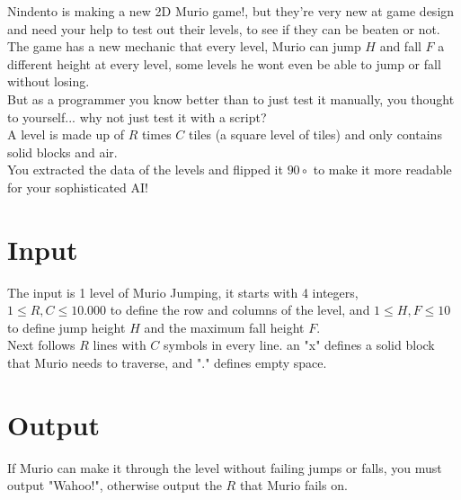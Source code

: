
Nindento is making a new 2D Murio game!, but they're very new at game design and need your help to test out their levels, to see if they can be beaten or not. \\
The game has a new mechanic that every level, Murio can jump $H$  and fall $F$ a different height at every level, some levels he wont even be able to jump or fall without losing. \\
But as a programmer you know better than to just test it manually, you thought to yourself... why not just test it with a script? \\
A level is made up of $R$ times $C$ tiles (a square level of tiles) and only contains solid blocks and air. \\
You extracted the data of the levels and flipped it $90\circ$ to make it more readable for your sophisticated AI!

\section*{Input}

The input is 1 level of Murio Jumping, it starts with 4 integers, $1 \leq R, C \leq 10.000 $ to define the row and columns of the level, and $1 \leq H,F \leq 10$ to define jump height $H$ and the maximum fall height $F$. \\
Next follows $R$ lines with $C$ symbols in every line. an "x" defines a solid block that Murio needs to traverse, and "." defines empty space.\\

\section*{Output}

If Murio can make it through the level without failing jumps or falls, you must output "Wahoo!", otherwise output the $R$ that Murio fails on.
